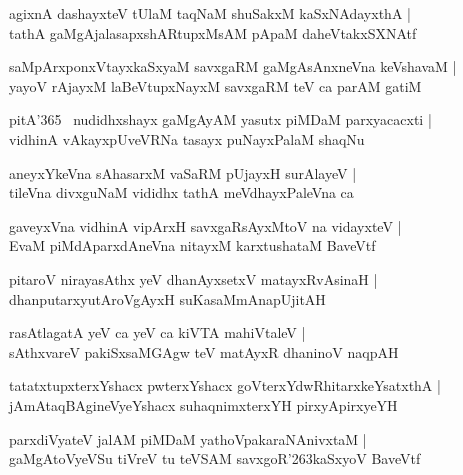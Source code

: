 \documentclass[twoside,12pt,openright]{book}
\def\S{\char'263}
\newcounter{shloka}[chapter]
\begin{document}
\begin{shloka}%
agixnA dashayxteV tUlaM taqNaM shuSakxM kaSxNAdayxthA |\\
tathA gaMgAjalasapxshARtupxMsAM pApaM daheVtakxSXNAtf 
\end{shloka}

\begin{shloka}%
saMpArxponxVtayxkaSxyaM savxgaRM gaMgAsAnxneVna keVshavaM |\\
yayoV rAjayxM laBeVtupxNayxM savxgaRM teV ca parAM gatiM 
\end{shloka}

\begin{shloka}%
pitA\char'365 ~nudidhxshayx gaMgAyAM yasutx piMDaM parxyacacxti |\\
vidhinA vAkayxpUveVRNa tasayx puNayxPalaM shaqNu
\end{shloka}

\begin{shloka}%
aneyxYkeVna sAhasarxM vaSaRM pUjayxH surAlayeV |\\
tileVna divxguNaM vididhx tathA meVdhayxPaleVna ca
\end{shloka}

\begin{shloka}%
gaveyxVna vidhinA vipArxH savxgaRsAyxMtoV na vidayxteV |\\
EvaM piMdAparxdAneVna nitayxM karxtushataM BaveVtf
\end{shloka}

\begin{shloka}%
pitaroV nirayasAthx yeV dhanAyxsetxV matayxRvAsinaH |\\
dhanputarxyutAroVgAyxH suKasaMmAnapUjitAH 
\end{shloka}

\begin{shloka}%
rasAtlagatA yeV ca yeV ca kiVTA mahiVtaleV |\\
sAthxvareV pakiSxsaMGAgw teV matAyxR dhaninoV naqpAH 
\end{shloka}

\begin{shloka}%
tatatxtupxterxYshacx pwterxYshacx goVterxYdwRhitarxkeYsatxthA |\\
jAmAtaqBAgineVyeYshacx suhaqnimxterxYH pirxyApirxyeYH
\end{shloka}

\begin{shloka}%
parxdiVyateV jalAM piMDaM yathoVpakaraNAnivxtaM |\\
gaMgAtoVyeVSu tiVreV tu teVSAM savxgoR\S kaSxyoV BaveVtf
\end{shloka}
\end{document}
